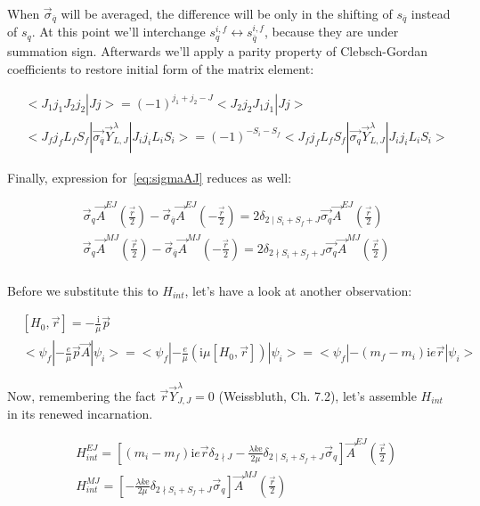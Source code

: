 When $\vec{\sigma}_{\overline{q}}$ will be averaged, the difference will be only in the shifting of $s_{\overline{q}}$ instead of $s_q$. At this point we'll interchange $s^{i,f}_{q} \leftrightarrow s^{i,f}_{\overline{q}}$, because they are under summation sign. Afterwards we'll apply a parity property of Clebsch-Gordan coefficients to restore initial form of the matrix element:

\begin{align}
    &<J_1 j_1 J_2 j_2 | J j> = (-1)^{j_1 + j_2 - J} <J_2 j_2 J_1 j_1 | J j> \\
    &<J_f j_f L_f S_f| \vec{\sigma_{\overline{q}}} \vec{Y}_{L, J}^\lambda |J_i j_i L_i S_i> = (-1)^{-S_i - S_f} <J_f j_f L_f S_f| \vec{\sigma_{q}} \vec{Y}_{L, J}^\lambda |J_i j_i L_i S_i>
\end{align}

Finally, expression for~\cref{eq:sigmaAJ} reduces as well:

\begin{align}
    &\vec{\sigma}_{q} \vec{A}^{EJ}(\frac{\vec{r}}{2}) - \vec{\sigma}_{\overline{q}} \vec{A}^{EJ}(-\frac{\vec{r}}{2}) = 2 \delta_{2 \mid S_i + S_f + J} \vec{\sigma_{q}} \vec{A}^{EJ}(\frac{\vec{r}}{2}) \\
    &\vec{\sigma}_{q} \vec{A}^{MJ}(\frac{\vec{r}}{2}) - \vec{\sigma}_{\overline{q}} \vec{A}^{MJ}(-\frac{\vec{r}}{2}) = 2 \delta_{2 \nmid S_i + S_f + J} \vec{\sigma_{q}} \vec{A}^{MJ}(\frac{\vec{r}}{2}) \\
\end{align}

Before we substitute this to $H_{int}$, let's have a look at another observation:

\begin{align}
    &[H_0, \vec{r}] = -\frac{\mathrm{i}}{\mu} \vec{p} \\
    &<\psi_f| -\frac{e}{\mu} \vec{p} \vec{A} |\psi_i> = <\psi_f| -\frac{e}{\mu} \left( \mathrm{i} \mu [H_0, \vec{r}]  \right) |\psi_i> = <\psi_f| -(m_f - m_i) \mathrm{i} e \vec{r} |\psi_i>
\end{align}

Now, remembering the fact $\vec{r} \vec{Y}^\lambda_{J, J} = 0$ (Weissbluth, Ch. 7.2)\cite{weissbluth}, let's assemble $H_{int}$ in its renewed incarnation.

\begin{align}
    &H_{int}^{EJ} = \left[(m_i - m_f) \mathrm{i} e \vec{r} \delta_{2 \nmid J} - \frac{\lambda k \mathrm{e}}{2 \mu} \delta_{2 \mid S_i + S_f + J} \vec{\sigma}_{q} \right] \vec{A}^{EJ}(\frac{\vec{r}}{2}) \\
    &H_{int}^{MJ} = \left[ -\frac{\lambda k \mathrm{e}}{2 \mu} \delta_{2 \nmid S_i + S_f + J} \vec{\sigma}_{q} \right] \vec{A}^{MJ}(\frac{\vec{r}}{2})
\end{align}

